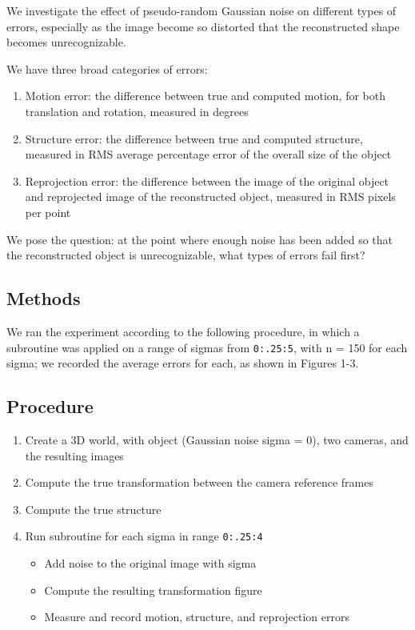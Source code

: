 \documentclass{article}
\begin{document}
We investigate the effect of pseudo-random Gaussian noise on different types of errors, especially as the image become so distorted that the reconstructed shape becomes unrecognizable.

We have three broad categories of errors:

\begin{enumerate}
  \item Motion error: the difference between true and computed motion, for both translation and rotation, measured in degrees
  \item Structure error: the difference between true and computed structure, measured in RMS average percentage error of the overall size of the object
  \item Reprojection error: the difference between the image of the original object and reprojected image of the reconstructed object, measured in RMS pixels per point
\end{enumerate} 

We pose the question: at the point where enough noise has been added so that the reconstructed object is unrecognizable, what types of errors fail first?




\subsection{Methods}

We ran the experiment according to the following procedure, in which a subroutine was applied on a range of sigmas from \texttt{0:.25:5}, with n = 150 for each sigma; we recorded the average errors for each, as shown in Figures 1-3.

\subsection*{Procedure}



\begin{enumerate}
  \item Create a 3D world, with object (Gaussian noise sigma = 0), two cameras, and the resulting images
  \item Compute the true transformation between the camera reference frames
  \item Compute the true structure
  \item Run subroutine for each sigma in range \texttt{0:.25:4}
  \begin{itemize}
  	\item Add noise to the original image with sigma
  	\item Compute the resulting transformation figure
  	\item Measure and record motion, structure, and reprojection errors
  \end{itemize}
\end{enumerate} 
\end{document}
